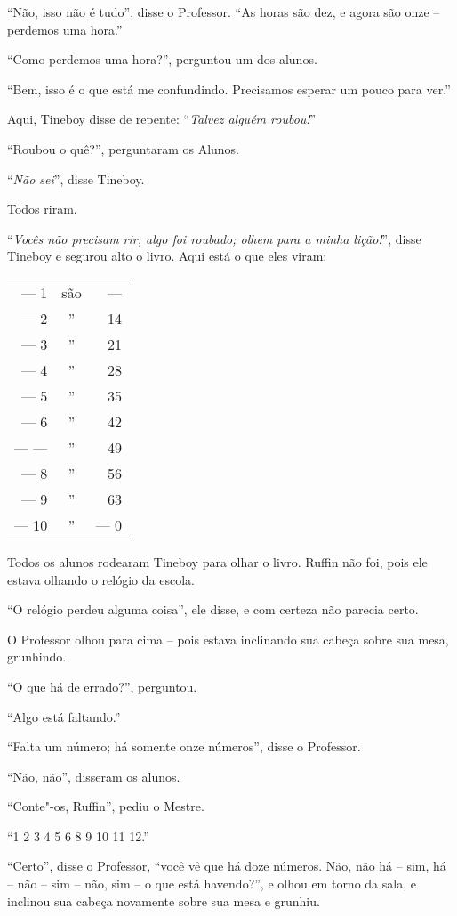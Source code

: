 ``Não, isso não é tudo'', disse o Professor. ``As horas são dez, e agora
são onze -- perdemos uma hora.''

``Como perdemos uma hora?'', perguntou um dos alunos.

``Bem, isso é o que está me confundindo. Precisamos esperar um pouco
para ver.''

Aqui, Tineboy disse de repente: ``\emph{Talvez alguém roubou!}''

``Roubou o quê?'', perguntaram os Alunos.

``\emph{Não sei}'', disse Tineboy.

Todos riram.

``\emph{Vocês não precisam rir, algo foi roubado; olhem para a minha
lição!}'', disse Tineboy e segurou alto o livro. Aqui está o que eles
viram:


\begin{center}
\begin{tabular}{rcr}
--- 1 & são & --- \\
--- 2 & ” & 14 \\
--- 3 & ” & 21 \\
--- 4 & ” & 28 \\
--- 5 & ” & 35 \\
--- 6 & ” & 42 \\
--- --- & ” & 49 \\
--- 8 & ” & 56 \\
--- 9 & ” & 63 \\
--- 10 & ” & --- 0
\end{tabular}
\end{center}

Todos os alunos rodearam Tineboy para olhar o livro. Ruffin não foi,
pois ele estava olhando o relógio da escola.

``O relógio perdeu alguma coisa'', ele disse, e com certeza não parecia
certo.

O Professor olhou para cima -- pois estava inclinando sua cabeça
sobre sua mesa, grunhindo.

``O que há de errado?'', perguntou.

``Algo está faltando.''

``Falta um número; há somente onze números'', disse o Professor.

``Não, não'', disseram os alunos.

``Conte"-os, Ruffin'', pediu o Mestre.

``1 2 3 4 5 6 8 9 10 11 12.''

``Certo'', disse o Professor, ``você vê que há doze números. Não, não há
-- sim, há -- não -- sim -- não, sim -- o que está havendo?'', e olhou
em torno da sala, e inclinou sua cabeça novamente sobre sua mesa e grunhiu.

